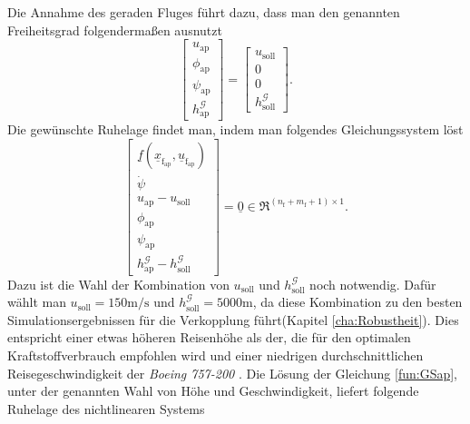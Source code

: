 Die Annahme des geraden Fluges führt dazu, dass man den genannten Freiheitsgrad folgenderma{\ss}en ausnutzt
\begin{equation}
\begin{bmatrix} 
u_\mathrm{ap} \\
\phi_\mathrm{ap} \\
\psi_\mathrm{ap}\\
h^\mathcal{G}_\mathrm{ap}
\end{bmatrix} = \begin{bmatrix} 
u_\mathrm{soll} \\
0 \\
0\\
h^\mathcal{G}_\mathrm{soll}
\end{bmatrix}.
\end{equation} 
Die gewünschte Ruhelage findet man, indem man folgendes Gleichungssystem löst
\begin{equation}
\label{fun:GSap}
\begin{bmatrix} 
\underline{f}(\underline{x}_\mathrm{f_{ap}},\underline{u}_\mathrm{f_{ap}}) \\
\dot{\psi} \\
u_\mathrm{ap} - u_\mathrm{soll}\\
\phi_\mathrm{ap}\\
\psi_\mathrm{ap}\\
h^\mathcal{G}_\mathrm{ap} -h^\mathcal{G}_\mathrm{soll}
\end{bmatrix} = \underline{0} \in \Re^{(n_\mathrm{f}+m_\mathrm{f}+1)\times 1}.
\end{equation}
Dazu ist die Wahl der Kombination von $u_\mathrm{soll}$ und $h^\mathcal{G}_\mathrm{soll}$ noch notwendig. Dafür wählt man $u_\mathrm{soll} = 150 \mathrm{m/s}$ und  $h^\mathcal{G}_\mathrm{soll} = 5000 \mathrm{m}$, da diese Kombination zu den  besten Simulationsergebnissen für die Verkopplung führt(Kapitel \ref{cha:Robustheit}). Dies entspricht einer etwas höheren Reisenhöhe als der, die für den optimalen Kraftstoffverbrauch \cite{OptimalHeight} empfohlen wird und einer niedrigen durchschnittlichen Reisegeschwindigkeit der \textit{Boeing 757-200} \cite{B7572}. Die Lösung der Gleichung \eqref{fun:GSap}, unter der genannten Wahl von Höhe und Geschwindigkeit, liefert folgende Ruhelage des nichtlinearen Systems \\
